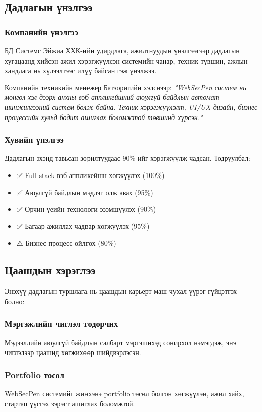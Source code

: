 \documentclass[main.tex]{subfiles}
\begin{document}
\subsection{Дадлагын үнэлгээ}

\subsubsection{Компанийн үнэлгээ}
БД Системс Эйжиа ХХК-ийн удирдлага, ажилтнуудын үнэлгээгээр дадлагын хугацаанд хийсэн ажил хэрэгжүүлсэн системийн чанар, техник түвшин, ажлын хандлага нь хүлээлтээс илүү байсан гэж үнэлжээ.

Компанийн техникийн менежер Батзоригийн хэлснээр:
\textit{"WebSecPen систем нь монгол хэл дээрх анхны вэб аппликейшний аюулгүй байдлын автомат шинжилгээний систем болж байна. Техник хэрэгжүүлэлт, UI/UX дизайн, бизнес процессийн хувьд бодит ашиглах боломжтой төвшинд хүрсэн."}

\subsubsection{Хувийн үнэлгээ}
Дадлагын эхэнд тавьсан зорилтуудаас 90\%-ийг хэрэгжүүлж чадсан. Тодруулбал:
\begin{itemize}
    \item ✅ Full-stack вэб аппликейшн хөгжүүлэх (100\%)
    \item ✅ Аюулгүй байдлын мэдлэг олж авах (95\%)
    \item ✅ Орчин үеийн технологи эзэмшүүлэх (90\%)
    \item ✅ Багаар ажиллах чадвар хөгжүүлэх (95\%)
    \item ⚠️ Бизнес процесс ойлгох (80\%)
\end{itemize}

\subsection{Цаашдын хэрэглээ}

Энэхүү дадлагын туршлага нь цаашдын карьерт маш чухал үүрэг гүйцэтгэх болно:

\subsubsection{Мэргэжлийн чиглэл тодорчих}
Мэдээллийн аюулгүй байдлын салбарт мэргэшихэд сонирхол нэмэгдэж, энэ чиглэлээр цаашид хөгжихөөр шийдвэрлэсэн.

\subsubsection{Portfolio төсөл}
WebSecPen системийг жинхэнэ portfolio төсөл болгон хөгжүүлэн, ажил хайх, стартап үүсгэх зэрэгт ашиглах боломжтой.
\end{document}
